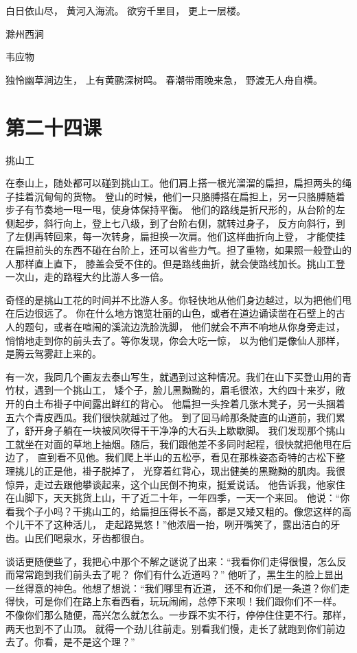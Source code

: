 \documentclass[12pt,UTF8]{ctexbook}
\begin{document}
白日依山尽，
黄河入海流。
欲穷千里目，
更上一层楼。

滁州西涧

韦应物

独怜幽草涧边生，
上有黄鹂深树鸣。
春潮带雨晚来急，
野渡无人舟自横。

\section{第二十四课}

挑山工

在泰山上，随处都可以碰到挑山工。他们肩上搭一根光溜溜的扁担，扁担两头的绳子挂着沉甸甸的货物。
登山的时候，他们一只胳膊搭在扁担上，另一只胳膊随着步子有节奏地一甩一甩，使身体保持平衡。
他们的路线是折尺形的，从台阶的左侧起步，斜行向上，登上七八级，到了台阶右侧，就转过身子，
反方向斜行，到了左侧再转回来，每一次转身，扁担换一次肩。他们这样曲折向上登，
才能使挂在扁担前头的东西不碰在台阶上，还可以省些力气。担了重物，如果照一般登山的人那样直上直下，
膝盖会受不住的。但是路线曲折，就会使路线加长。挑山工登一次山，走的路程大约比游人多一倍。

奇怪的是挑山工花的时间并不比游人多。你轻快地从他们身边越过，以为把他们甩在后边很远了。
你在什么地方饱览壮丽的山色，或者在道边诵读凿在石壁上的古人的题句，或者在喧闹的溪流边洗脸洗脚，
他们就会不声不响地从你身旁走过，悄悄地走到你的前头去了。等你发现，你会大吃一惊，
以为他们是像仙人那样，是腾云驾雾赶上来的。

有一次，我同几个画友去泰山写生，就遇到过这种情况。我们在山下买登山用的青竹杖，遇到一个挑山工，
矮个子，脸儿黑黝黝的，眉毛很浓，大约四十来岁，敞开的白土布褂子中间露出鲜红的背心。
他扁担一头拴着几张木凳子，另一头捆着五六个青皮西瓜。我们很快就越过了他。
到了回马岭那条陡直的山道前，我们累了，舒开身子躺在一块被风吹得干干净净的大石头上歇歇脚。
我们发现那个挑山工就坐在对面的草地上抽烟。随后，我们跟他差不多同时起程，很快就把他甩在后边了，
直到看不见他。我们爬上半山的五松亭，看见在那株姿态奇特的古松下整理挑儿的正是他，褂子脱掉了，
光穿着红背心，现出健美的黑黝黝的肌肉。我很惊异，走过去跟他攀谈起来，这个山民倒不拘束，挺爱说话。
他告诉我，他家住在山脚下，天天挑货上山，干了近二十年，一年四季，一天一个来回。
他说：“你看我个子小吗？干挑山工的，给扁担压得长不高，都是又矮又粗的。像您这样的高个儿干不了这种活儿，
走起路晃悠！”他浓眉一抬，咧开嘴笑了，露出洁白的牙齿。山民们喝泉水，牙齿都很白。

谈话更随便些了，我把心中那个不解之谜说了出来：“我看你们走得很慢，怎么反而常常跑到我们前头去了呢？
你们有什么近道吗？” 他听了，黑生生的脸上显出一丝得意的神色。他想了想说：“我们哪里有近道，
还不和你们是一条道？你们走得快，可是你们在路上东看西看，玩玩闹闹，总停下来呗！我们跟你们不一样。
不像你们那么随便，高兴怎么就怎么。一步踩不实不行，停停住住更不行。那样，两天也到不了山顶。
就得一个劲儿往前走。别看我们慢，走长了就跑到你们前边去了。你看，是不是这个理？”
\end{document}
